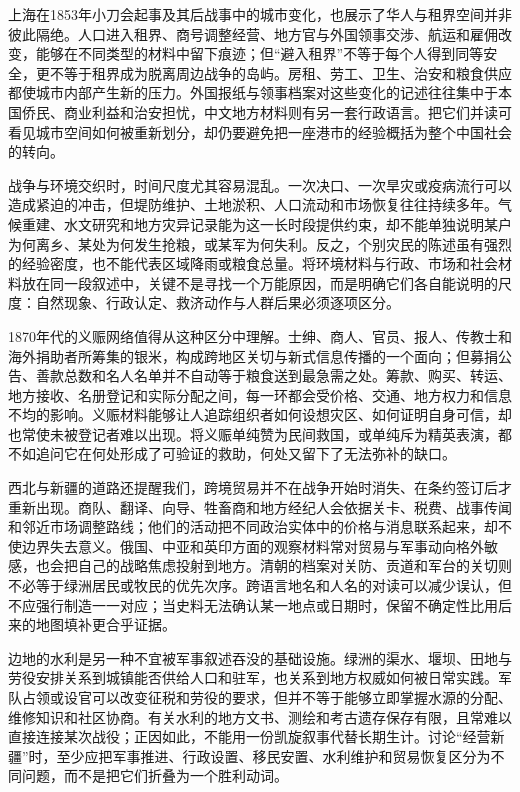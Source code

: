 上海在1853年小刀会起事及其后战事中的城市变化，也展示了华人与租界空间并非彼此隔绝。人口进入租界、商号调整经营、地方官与外国领事交涉、航运和雇佣改变，能够在不同类型的材料中留下痕迹；但“避入租界”不等于每个人得到同等安全，更不等于租界成为脱离周边战争的岛屿。房租、劳工、卫生、治安和粮食供应都使城市内部产生新的压力。外国报纸与领事档案对这些变化的记述往往集中于本国侨民、商业利益和治安担忧，中文地方材料则有另一套行政语言。把它们并读可看见城市空间如何被重新划分，却仍要避免把一座港市的经验概括为整个中国社会的转向。

战争与环境交织时，时间尺度尤其容易混乱。一次决口、一次旱灾或疫病流行可以造成紧迫的冲击，但堤防维护、土地淤积、人口流动和市场恢复往往持续多年。气候重建、水文研究和地方灾异记录能为这一长时段提供约束，却不能单独说明某户为何离乡、某处为何发生抢粮，或某军为何失利。反之，个别灾民的陈述虽有强烈的经验密度，也不能代表区域降雨或粮食总量。将环境材料与行政、市场和社会材料放在同一段叙述中，关键不是寻找一个万能原因，而是明确它们各自能说明的尺度：自然现象、行政认定、救济动作与人群后果必须逐项区分。

1870年代的义赈网络值得从这种区分中理解。士绅、商人、官员、报人、传教士和海外捐助者所筹集的银米，构成跨地区关切与新式信息传播的一个面向；但募捐公告、善款总数和名人名单并不自动等于粮食送到最急需之处。筹款、购买、转运、地方接收、名册登记和实际分配之间，每一环都会受价格、交通、地方权力和信息不均的影响。义赈材料能够让人追踪组织者如何设想灾区、如何证明自身可信，却也常使未被登记者难以出现。将义赈单纯赞为民间救国，或单纯斥为精英表演，都不如追问它在何处形成了可验证的救助，何处又留下了无法弥补的缺口。

西北与新疆的道路还提醒我们，跨境贸易并不在战争开始时消失、在条约签订后才重新出现。商队、翻译、向导、牲畜商和地方经纪人会依据关卡、税费、战事传闻和邻近市场调整路线；他们的活动把不同政治实体中的价格与消息联系起来，却不使边界失去意义。俄国、中亚和英印方面的观察材料常对贸易与军事动向格外敏感，也会把自己的战略焦虑投射到地方。清朝的档案对关防、贡道和军台的关切则不必等于绿洲居民或牧民的优先次序。跨语言地名和人名的对读可以减少误认，但不应强行制造一一对应；当史料无法确认某一地点或日期时，保留不确定性比用后来的地图填补更合乎证据。

边地的水利是另一种不宜被军事叙述吞没的基础设施。绿洲的渠水、堰坝、田地与劳役安排关系到城镇能否供给人口和驻军，也关系到地方权威如何被日常实践。军队占领或设官可以改变征税和劳役的要求，但并不等于能够立即掌握水源的分配、维修知识和社区协商。有关水利的地方文书、测绘和考古遗存保存有限，且常难以直接连接某次战役；正因如此，不能用一份凯旋叙事代替长期生计。讨论“经营新疆”时，至少应把军事推进、行政设置、移民安置、水利维护和贸易恢复区分为不同问题，而不是把它们折叠为一个胜利动词。

